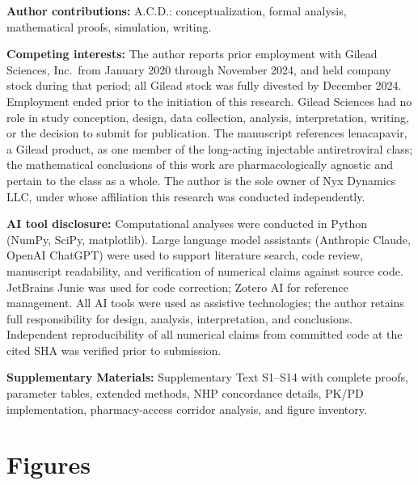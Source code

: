\documentclass[10pt,letterpaper]{article}
\theoremstyle{definition}
\theoremstyle{remark}
\begin{document}
\textbf{Author contributions:} A.C.D.: conceptualization, formal analysis, mathematical proofs, simulation, writing.

\textbf{Competing interests:} The author reports prior employment with Gilead Sciences, Inc.\ from January 2020 through November 2024, and held company stock during that period; all Gilead stock was fully divested by December 2024. Employment ended prior to the initiation of this research. Gilead Sciences had no role in study conception, design, data collection, analysis, interpretation, writing, or the decision to submit for publication. The manuscript references lenacapavir, a Gilead product, as one member of the long-acting injectable antiretroviral class; the mathematical conclusions of this work are pharmacologically agnostic and pertain to the class as a whole. The author is the sole owner of Nyx Dynamics LLC, under whose affiliation this research was conducted independently.


\textbf{AI tool disclosure:} Computational analyses were conducted in Python (NumPy, SciPy, matplotlib). Large language model assistants (Anthropic Claude, OpenAI ChatGPT) were used to support literature search, code review, manuscript readability, and verification of numerical claims against source code. JetBrains Junie was used for code correction; Zotero AI for reference management. All AI tools were used as assistive technologies; the author retains full responsibility for design, analysis, interpretation, and conclusions. Independent reproducibility of all numerical claims from committed code at the cited SHA was verified prior to submission.

\textbf{Supplementary Materials:} Supplementary Text S1--S14 with complete proofs, parameter tables, extended methods, NHP concordance details, PK/PD implementation, pharmacy-access corridor analysis, and figure inventory.


\newpage
\section*{Figures}
\end{document}
